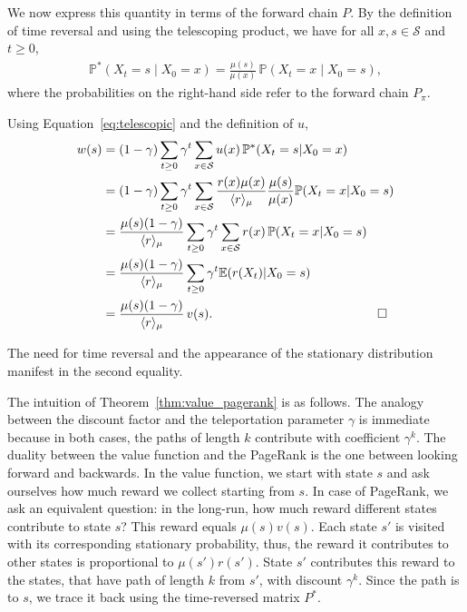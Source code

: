 \documentclass[letterpaper, 10 pt, conference]{ieeeconf}
\begin{document}
We now express this quantity in terms of the forward chain $P$. By the
definition of time reversal and using the telescoping product, we have for all $x,s\in\mathcal S$ and $t\ge0$,
\begin{align}
\label{eq:telescopic}
\mathbb{P}^*(X_t=s\mid X_0=x)
=
\frac{\mu(s)}{\mu(x)}\,\mathbb{P}(X_t=x\mid X_0=s),
\end{align}
where the probabilities on the right-hand side refer to the forward chain
$P_\pi$.

Using Equation~\eqref{eq:telescopic} and the definition of $u$,
\begin{align*}
w(s)
&=
(1-\gamma)\sum_{t\ge 0}\gamma^t
\sum_{x\in\mathcal S}
u(x)\,\mathbb{P}^*(X_t=s| X_0=x)
\\
&=
(1-\gamma)\sum_{t\ge 0}\gamma^t
\sum_{x\in\mathcal S}
\frac{r(x)\mu(x)}{\langle r\rangle_\mu}
\frac{\mu(s)}{\mu(x)}
\mathbb{P}(X_t=x| X_0=s)
\\
&=
\frac{\mu(s) (1-\gamma)}{\langle r\rangle_\mu}
\sum_{t\ge 0}\gamma^t
\sum_{x\in\mathcal S}
r(x)\,\mathbb{P}(X_t=x| X_0=s)
\\
&=
\frac{\mu(s) (1-\gamma)}{\langle r\rangle_\mu}
\sum_{t\ge 0}\gamma^t
\mathbb{E}(r(X_t)| X_0=s)
\\
&=
\frac{\mu(s)(1-\gamma)}{\langle r\rangle_\mu}\, v(s). \hspace{4.57cm}\Box
\end{align*} 


The need for time reversal and the appearance of the stationary distribution manifest in the second equality. 

The intuition of Theorem~\ref{thm:value_pagerank} is as follows. The analogy between the discount factor and the teleportation parameter $\gamma$ is immediate because in both cases, the paths of length $k$ contribute with coefficient $\gamma^k$. The duality between the value function and the PageRank is the one between looking forward and backwards. In the value function, we start with state $s$ and ask ourselves how much reward we collect starting from $s$. In case of PageRank, we ask an equivalent question: in the long-run, how much reward different states contribute to state $s$? This reward equals $\mu(s)v(s)$. Each state $s'$ is visited with its corresponding stationary probability, thus, the reward it contributes to other states is proportional to $\mu(s')r(s')$. State $s'$  contributes this reward to the states, that have path of length $k$ from $s'$, with discount $\gamma^k$. Since the path is {to} $s$, we trace it back using the time-reversed matrix $P^*$. 
\end{document}
